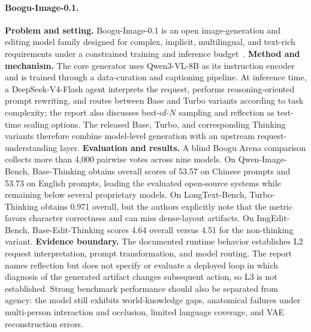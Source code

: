 \paragraph{Boogu-Image-0.1.}
\textbf{Problem and setting.} Boogu-Image-0.1 is an open image-generation and editing model family designed for complex, implicit, multilingual, and text-rich requirements under a constrained training and inference budget~\cite{avg260713125}. \textbf{Method and mechanism.} The core generator uses Qwen3-VL-8B as its instruction encoder and is trained through a data-curation and captioning pipeline. At inference time, a DeepSeek-V4-Flash agent interprets the request, performs reasoning-oriented prompt rewriting, and routes between Base and Turbo variants according to task complexity; the report also discusses best-of-$N$ sampling and reflection as test-time scaling options. The released Base, Turbo, and corresponding Thinking variants therefore combine model-level generation with an upstream request-understanding layer. \textbf{Evaluation and results.} A blind Boogu Arena comparison collects more than 4,000 pairwise votes across nine models. On Qwen-Image-Bench, Base-Thinking obtains overall scores of 53.57 on Chinese prompts and 53.73 on English prompts, leading the evaluated open-source systems while remaining below several proprietary models. On LongText-Bench, Turbo-Thinking obtains 0.971 overall, but the authors explicitly note that the metric favors character correctness and can miss dense-layout artifacts. On ImgEdit-Bench, Base-Edit-Thinking scores 4.64 overall versus 4.51 for the non-thinking variant. \textbf{Evidence boundary.} The documented runtime behavior establishes L2 request interpretation, prompt transformation, and model routing. The report names reflection but does not specify or evaluate a deployed loop in which diagnosis of the generated artifact changes subsequent action, so L3 is not established. Strong benchmark performance should also be separated from agency: the model still exhibits world-knowledge gaps, anatomical failures under multi-person interaction and occlusion, limited language coverage, and VAE reconstruction errors.

